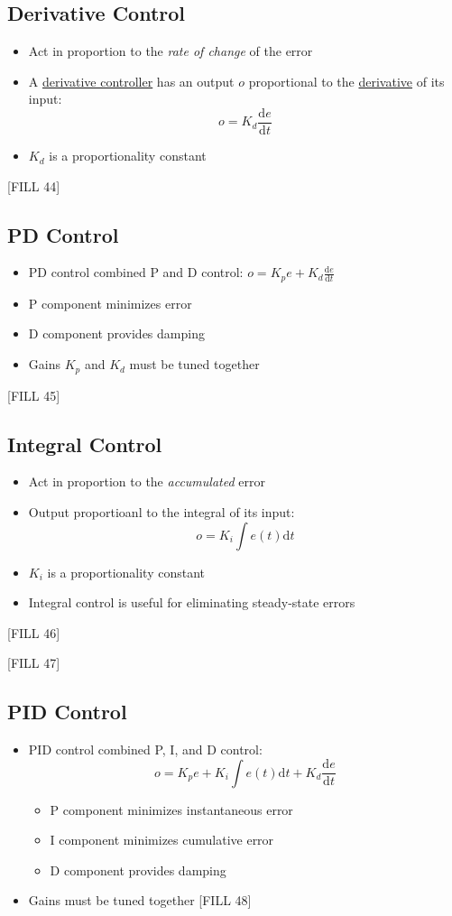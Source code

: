 \documentclass[10pt]{article}
\newcommand{\dd}{\text{d}}
\begin{document}
\subsection*{Derivative Control}
\begin{itemize}
	\item Act in proportion to the \textit{rate of change} of the error
	\item A \underline{derivative controller} has an output $o$ proportional to the \underline{derivative} of its input:
	\[o = K_d \frac{\dd e}{\dd t}\]
    \item $K_d$ is a proportionality constant
\end{itemize}
\begin{center} 
	[FILL 44]
\end{center}

\subsection*{PD Control}
\begin{itemize}
	\item PD control combined P and D control: $o = K_p e + K_d \frac{\dd e}{\dd t}$
	\item P component minimizes error
	\item D component provides damping
	\item Gains $K_p$ and $K_d$ must be tuned together
\end{itemize}
[FILL 45]

\subsection*{Integral Control}
\begin{itemize}
	\item Act in proportion to the \textit{accumulated} error
    \item Output proportioanl to the integral of its input:
    \[o = K_i \int e(t) \dd t\]
    \item $K_i$ is a proportionality constant
    \item Integral control is useful for eliminating steady-state errors
\end{itemize}
[FILL 46]

[FILL 47]

\subsection*{PID Control}
\begin{itemize}
	\item PID control combined P, I, and D control:
	\[o = K_p e + K_i \int e(t) \dd t + K_d \frac{\dd e}{\dd t}\]
    \begin{itemize}
        \item P component minimizes instantaneous error
        \item I component minimizes cumulative error
        \item D component provides damping
    \end{itemize}
    \item Gains must be tuned together
    [FILL 48]
\end{itemize}
\end{document}
